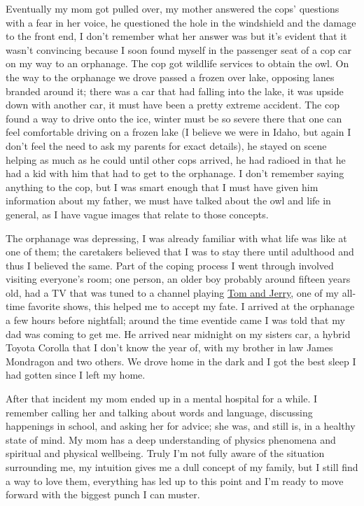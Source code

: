 \documentclass[12pt]{article}
\begin{document}
Eventually my mom got pulled over, my mother answered the cops' questions with a
fear in her voice, he questioned the hole in the windshield and the damage to
the front end, I don't remember what her answer was but it's evident that it
wasn't convincing because I soon found myself in the passenger seat of a cop car
on my way to an orphanage. The cop got wildlife services to obtain the owl. On
the way to the orphanage we drove passed a frozen over lake, opposing lanes
branded around it; there was a car that had falling into the lake, it was upside
down with another car, it must have been a pretty extreme accident. The cop
found a way to drive onto the ice, winter must be so severe there that one can
feel comfortable driving on a frozen lake (I believe we were in Idaho, but again
I don't feel the need to ask my parents for exact details), he stayed on scene
helping as much as he could until other cops arrived, he had radioed in that he
had a kid with him that had to get to the orphanage. I don't remember saying
anything to the cop, but I was smart enough that I must have given him
information about my father, we must have talked about the owl and life in
general, as I have vague images that relate to those concepts.

The orphanage was depressing, I was already familiar with what life was like at
one of them; the caretakers believed that I was to stay there until adulthood
and thus I believed the same. Part of the coping process I went through involved
visiting everyone's room; one person, an older boy probably around fifteen years
old, had a TV that was tuned to a channel playing
{\color{blue}\underline{\href{https://www.britannica.com/topic/Tom-and-Jerry}{Tom
and Jerry}}}, one of my all-time favorite shows, this helped me to accept my
fate. I arrived at the orphanage a few hours before nightfall; around the time
eventide came I was told that my dad was coming to get me. He arrived near
midnight on my sisters car, a hybrid Toyota Corolla that I don't know the year
of, with my brother in law James Mondragon and two others. We drove home in the
dark and I got the best sleep I had gotten since I left my home.

After that incident my mom ended up in a mental hospital for a while. I remember
calling her and talking about words and language, discussing happenings in
school, and asking her for advice; she was, and still is, in a healthy state of
mind. My mom has a deep understanding of physics phenomena and spiritual and
physical wellbeing. Truly I'm not fully aware of the situation surrounding me,
my intuition gives me a dull concept of my family, but I still find a way to
love them, everything has led up to this point and I'm ready to move forward
with the biggest punch I can muster.
\end{document}
